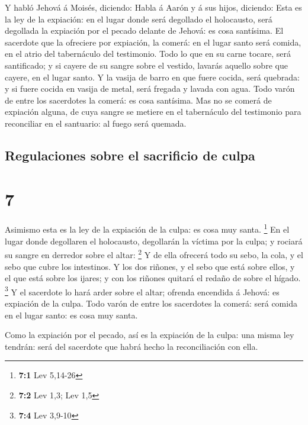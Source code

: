  Y habló Jehová á Moisés, diciendo:  Habla á
Aarón y á sus hijos, diciendo: Esta es la ley de la expiación: en el
lugar donde será degollado el holocausto, será degollada la expiación
por el pecado delante de Jehová: es cosa santísima.  El
sacerdote que la ofreciere por expiación, la comerá: en el lugar santo
será comida, en el atrio del tabernáculo del testimonio. 
Todo lo que en su carne tocare, será santificado; y si cayere de su
sangre sobre el vestido, lavarás aquello sobre que cayere, en el lugar
santo.  Y la vasija de barro en que fuere cocida, será
quebrada: y si fuere cocida en vasija de metal, será fregada y lavada
con agua.  Todo varón de entre los sacerdotes la comerá: es
cosa santísima.  Mas no se comerá de expiación alguna, de
cuya sangre se metiere en el tabernáculo del testimonio para reconciliar
en el santuario: al fuego será quemada.

\hypertarget{regulaciones-sobre-el-sacrificio-de-culpa}{%
\subsection{Regulaciones sobre el sacrificio de
culpa}\label{regulaciones-sobre-el-sacrificio-de-culpa}}

\hypertarget{section-6}{%
\section{7}\label{section-6}}

 Asimismo esta es la ley de la expiación de la culpa: es
cosa muy santa. \footnote{\textbf{7:1} Lev 5,14-26}  En el
lugar donde degollaren el holocausto, degollarán la víctima por la
culpa; y rociará su sangre en derredor sobre el altar: \footnote{\textbf{7:2}
  Lev 1,3; Lev 1,5}  Y de ella ofrecerá todo su sebo, la
cola, y el sebo que cubre los intestinos.  Y los dos
riñones, y el sebo que está sobre ellos, y el que está sobre los ijares;
y con los riñones quitará el redaño de sobre el hígado. \footnote{\textbf{7:4}
  Lev 3,9-10}  Y el sacerdote lo hará arder sobre el altar;
ofrenda encendida á Jehová: es expiación de la culpa.  Todo
varón de entre los sacerdotes la comerá: será comida en el lugar santo:
es cosa muy santa.

 Como la expiación por el pecado, así es la expiación de la
culpa: una misma ley tendrán: será del sacerdote que habrá hecho la
reconciliación con ella.

